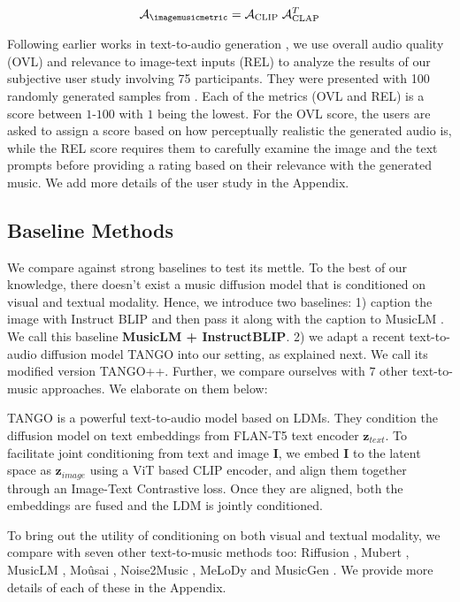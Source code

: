 \begin{equation}
\mathcal{A}_{\text{\imagemusicmetric}} = \mathcal{A}_{\text{CLIP}}\;\mathcal{A}_{\text{CLAP}}^{T}
\end{equation}

Following earlier works in text-to-audio generation \cite{tango, audioldm, audiogen}, we use overall audio quality (OVL) and relevance to image-text inputs (REL) to analyze the results of our subjective user study involving 75 participants. They were presented with 100 randomly generated samples from \modelname. Each of the metrics (OVL and REL) is a score between $1$-$100$ with $1$ being the lowest. For the OVL score, the users are asked to assign a score based on how perceptually realistic the generated audio is, while the REL score requires them to carefully examine the image and the text prompts before providing a rating based on their relevance with the generated music. We add more details of the user study in the Appendix.

\subsection{Baseline Methods}

We compare \modelname against strong baselines to test its mettle. To the best of our knowledge, there doesn't exist a music diffusion model that is conditioned on visual and textual modality. Hence, we introduce two baselines: 1) caption the image with Instruct BLIP \cite{instructBLIP} and then pass it along with the caption to MusicLM \cite{musiclm}. We call this baseline \textbf{MusicLM + InstructBLIP}.  2) we adapt a recent text-to-audio diffusion model TANGO \cite{tango} into our setting, as explained next. We call its modified version TANGO++. Further, we compare ourselves with $7$ other text-to-music approaches. We elaborate on them below:

TANGO \cite{tango} is a powerful text-to-audio model based on LDMs. They condition the diffusion model on text embeddings from FLAN-T5 \cite{flant5} text encoder $\bm{z}_{text}$. To facilitate joint conditioning from text and image $\bm{I}$, we embed $\bm{I}$ to the latent space as $\bm{z}_{image}$ using a ViT \cite{vit} based CLIP encoder, and align them together through an Image-Text Contrastive loss. Once they are aligned, both the embeddings are fused and the LDM is jointly conditioned. 

To bring out the utility of conditioning on both visual and textual modality, we compare \modelname with seven other text-to-music methods too: Riffusion \cite{riffusion}, Mubert \cite{mubert}, MusicLM \cite{musiclm}, Moûsai \cite{mousai}, Noise2Music \cite{noise2music}, MeLoDy \cite{melody} and MusicGen \cite{musicgen}. We provide more details of each of these in the Appendix.

